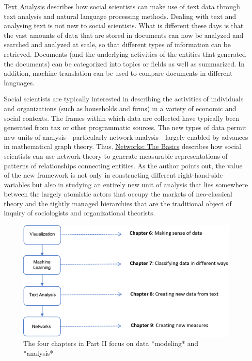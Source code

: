 \documentclass[]{krantz}
\begin{document}
\protect\hyperlink{chap:text}{Text Analysis} describes how social
scientists can make use of text data through text analysis and natural
language processing methods. Dealing with text and analysing text is not
new to social scientists. What is different these days is that the vast
amounts of data that are stored in documents can now be analyzed and
searched and analyzed at scale, so that different types of information
can be retrieved. Documents (and the underlying activities of the
entities that generated the documents) can be categorized into topics or
fields as well as summarized. In addition, machine translation can be
used to compare documents in different languages.

Social scientists are typically interested in describing the activities
of individuals and organizations (such as households and firms) in a
variety of economic and social contexts. The frames within which data
are collected have typically been generated from tax or other
programmatic sources. The new types of data permit new units of
analysis---particularly network analysis---largely enabled by advances
in mathematical graph theory. Thus,
\protect\hyperlink{chap:networks}{Networks: The Basics} describes how
social scientists can use network theory to generate measurable
representations of patterns of relationships connecting entities. As the
author points out, the value of the new framework is not only in
constructing different right-hand-side variables but also in studying an
entirely new unit of analysis that lies somewhere between the largely
atomistic actors that occupy the markets of neo-classical theory and the
tightly managed hierarchies that are the traditional object of inquiry
of sociologists and organizational theorists.

\begin{figure}

{\centering \includegraphics[width=0.9\linewidth]{ChapterIntro/figures/Figure3_new} 

}

\caption{The four chapters in Part II focus on data *modeling* and *analysis*}\label{fig:fig4}
\end{figure}
\end{document}
